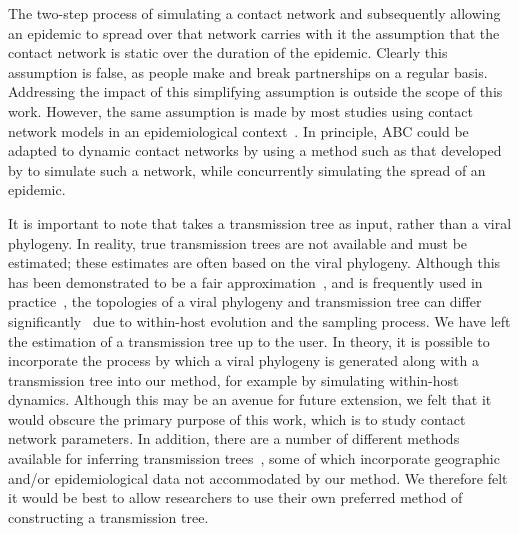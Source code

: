 The two-step process of simulating a contact network and subsequently allowing
an epidemic to spread over that network carries with it the assumption that the
contact network is static over the duration of the epidemic. Clearly this
assumption is false, as people make and break partnerships on a regular basis.
Addressing the impact of this simplifying assumption is outside the scope of
this work. However, the same assumption is made by most studies using contact
network models in an epidemiological context~\autocite{welch2011statistical,
bansal2007individual}. In principle, \gls{ABC} could be adapted
to dynamic contact networks by using a method such as that developed by
\textcite{robinson2012dynamics} to simulate such a network, while concurrently
simulating the spread of an epidemic.

It is important to note that  takes a transmission tree as
input, rather than a viral phylogeny. In reality, true transmission trees are
not available and must be estimated; these estimates are often based on the
viral phylogeny. Although this has been demonstrated to be a fair
approximation~\autocite[e.g.][]{leitner1996accurate}, and is frequently used in
practice~\autocite[e.g.][]{stadler2013uncovering}, the topologies of a viral
phylogeny and transmission tree can differ
significantly~\autocite{ypma2013relating, hall2015epidemic} due to within-host
evolution and the sampling process. We have left the estimation of a
transmission tree up to the user. In theory, it is possible to incorporate the
process by which a viral phylogeny is generated along with a transmission tree
into our method, for example by simulating within-host dynamics.  Although this may
be an avenue for future extension, we felt that it would obscure the primary
purpose of this work, which is to study contact network parameters. In
addition, there are a number of different methods available for inferring
transmission trees~\autocite{didelot2014bayesian, ypma2012unravelling,
jombart2011reconstructing, cottam2008integrating, hall2015epidemic}, some of
which incorporate geographic and/or epidemiological data not accommodated by
our method. We therefore felt it would be best to allow researchers to use
their own preferred method of constructing a transmission tree.

